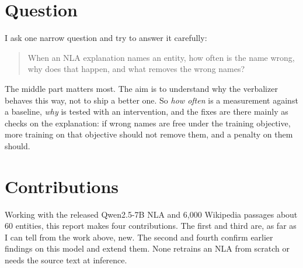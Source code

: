 \section{Question}

I ask one narrow question and try to answer it carefully:

\begin{quote}
When an NLA explanation names an entity, how often is the name wrong, why does that happen, and what removes
the wrong names?
\end{quote}

The middle part matters most. The aim is to understand why the verbalizer behaves this way, not to ship a
better one. So \emph{how often} is a measurement against a baseline, \emph{why} is tested with an
intervention, and the fixes are there mainly as checks on the explanation: if wrong names are free under the
training objective, more training on that objective should not remove them, and a penalty on them should.

\section{Contributions}

Working with the released Qwen2.5-7B NLA and 6{,}000 Wikipedia passages about 60 entities, this report makes
four contributions. The first and third are, as far as I can tell from the work above, new. The second and
fourth confirm earlier findings on this model and extend them. None retrains an NLA from scratch or needs the
source text at inference.


